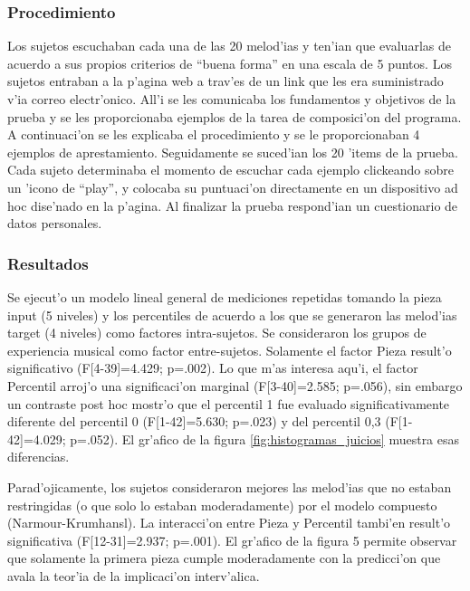 \subsubsection{Procedimiento}
Los sujetos escuchaban cada una de las 20 melod'ias y ten'ian que evaluarlas de acuerdo a sus propios criterios de ``buena forma'' en una escala de 5 puntos. 
Los sujetos entraban a la p'agina web a trav'es de un link que les era suministrado v'ia correo electr'onico. All'i se les comunicaba los fundamentos y objetivos 
de la prueba y se les proporcionaba ejemplos de la tarea de composici'on del programa. A continuaci'on se les explicaba el procedimiento y se le proporcionaban 4 
ejemplos de aprestamiento. Seguidamente se suced'ian los 20 'items de la prueba. Cada sujeto determinaba el momento de escuchar cada ejemplo clickeando sobre un 
'icono de ``play'', y colocaba su puntuaci'on directamente en un dispositivo ad hoc dise'nado en la p'agina. Al finalizar la prueba respond'ian un 
cuestionario de datos personales. 

\subsubsection{Resultados}
Se ejecut'o un modelo lineal general de mediciones repetidas tomando la pieza input (5 niveles) y los percentiles de acuerdo a los que se generaron las melod'ias 
target (4 niveles) como factores intra-sujetos. Se consideraron los grupos de experiencia musical como factor entre-sujetos. 
Solamente el factor Pieza result'o significativo (F[4-39]=4.429; p=.002). Lo que m'as interesa aqu'i, el factor Percentil arroj'o una significaci'on marginal 
(F[3-40]=2.585; p=.056), sin embargo un contraste post hoc mostr'o que el percentil 1 fue evaluado significativamente diferente del percentil 0 (F[1-42]=5.630; p=.023)
y del percentil 0,3 (F[1-42]=4.029; p=.052). El gr'afico de la figura \ref{fig:histogramas_juicios} muestra esas diferencias. 

\begin{imagen}
    \width{5cm}
\end{imagen}

Parad'ojicamente, los sujetos consideraron mejores las melod'ias que no estaban restringidas (o que solo lo estaban moderadamente) por el modelo compuesto (Narmour-Krumhansl). 
La interacci'on entre Pieza y Percentil tambi'en result'o significativa (F[12-31]=2.937; p=.001). El gr'afico de la figura 5 permite observar que solamente la primera pieza cumple moderadamente con la predicci'on que avala la teor'ia de la implicaci'on interv'alica.


